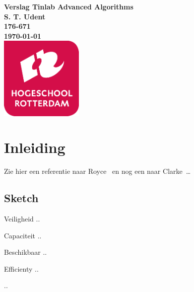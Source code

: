 \documentclass{article}
\begin{document}
\sffamily
\begin{titlepage}
  \centering
    \vfill
    {\bfseries\Huge
      Verslag Tinlab Advanced Algorithms \\
        \vskip2cm
      }
      {\bfseries\Large
        S. T. Udent\\
      }
      {
        \bfseries\normalsize
        176-671\\
        \vskip1cm
        \today\\
    }    
    \vfill
    \includegraphics[width=4cm]{logohr.png} %
    \vfill
    \vfill
\end{titlepage}
\newpage
\tableofcontents

\newpage
\section{Inleiding}
Zie hier een referentie naar Royce~\cite{royce1987managing} en nog een naar Clarke~\cite{modelchecking}\ldots 

\subsection{Sketch}
\item [Veiligheid] ..
\item [Capaciteit] ..
\item [Beschikbaar] ..
\item [Efficienty] ..
\item [..]
\end{document}

